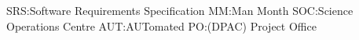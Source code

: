 SRS:Software Requirements Specification
MM:Man Month
SOC:Science Operations Centre
AUT:AUTomated
PO:(DPAC) Project Office
